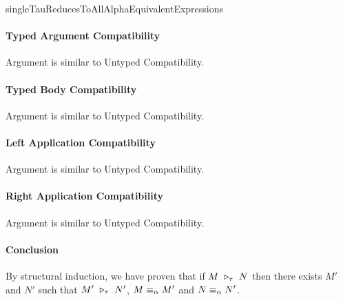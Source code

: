 \begin{longproof}{singleTauReducesToAllAlphaEquivalentExpressions}
\paragraph{Typed Argument Compatibility}
Argument is similar to Untyped Compatibility.

\paragraph{Typed Body Compatibility}
Argument is similar to Untyped Compatibility.

\paragraph{Left Application Compatibility}
Argument is similar to Untyped Compatibility.

\paragraph{Right Application Compatibility}
Argument is similar to Untyped Compatibility.

\paragraph{Conclusion}
By structural induction, we have proven that if $M \ \triangleright_{\tau}\  N$ then there exists $M'$ and $N'$ such that $M' \ \triangleright_{\tau}\  N'$, $M \equiv_\alpha M'$ and $N \equiv_\alpha N'$.

\end{longproof}



